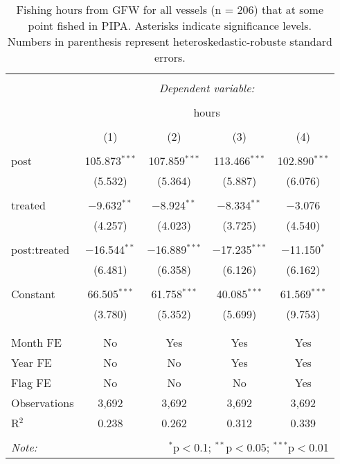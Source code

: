 \documentclass[]{article}
\theoremstyle{definition}
\theoremstyle{definition}
\theoremstyle{definition}
\theoremstyle{remark}
\begin{document}
\begin{table}[!htbp] \centering 
  \caption{\label{tab:all_vessels}Fishing hours from GFW for all vessels (n = 206) that at some point fished in PIPA. Asterisks indicate significance levels. Numbers in parenthesis represent heteroskedastic-robuste standard errors.} 
  \label{} 
\begin{tabular}{@{\extracolsep{5pt}}lcccc} 
\\[-1.8ex]\hline 
\hline \\[-1.8ex] 
 & \multicolumn{4}{c}{\textit{Dependent variable:}} \\ 
\cline{2-5} 
\\[-1.8ex] & \multicolumn{4}{c}{hours} \\ 
\\[-1.8ex] & (1) & (2) & (3) & (4)\\ 
\hline \\[-1.8ex] 
 post & 105.873$^{***}$ & 107.859$^{***}$ & 113.466$^{***}$ & 102.890$^{***}$ \\ 
  & (5.532) & (5.364) & (5.887) & (6.076) \\ 
  & & & & \\ 
 treated & $-$9.632$^{**}$ & $-$8.924$^{**}$ & $-$8.334$^{**}$ & $-$3.076 \\ 
  & (4.257) & (4.023) & (3.725) & (4.540) \\ 
  & & & & \\ 
 post:treated & $-$16.544$^{**}$ & $-$16.889$^{***}$ & $-$17.235$^{***}$ & $-$11.150$^{*}$ \\ 
  & (6.481) & (6.358) & (6.126) & (6.162) \\ 
  & & & & \\ 
 Constant & 66.505$^{***}$ & 61.758$^{***}$ & 40.085$^{***}$ & 61.569$^{***}$ \\ 
  & (3.780) & (5.352) & (5.699) & (9.753) \\ 
  & & & & \\ 
\hline \\[-1.8ex] 
Month FE & No & Yes & Yes & Yes \\ 
Year FE & No & No & Yes & Yes \\ 
Flag FE & No & No & No & Yes \\ 
Observations & 3,692 & 3,692 & 3,692 & 3,692 \\ 
R$^{2}$ & 0.238 & 0.262 & 0.312 & 0.339 \\ 
\hline 
\hline \\[-1.8ex] 
\textit{Note:}  & \multicolumn{4}{r}{$^{*}$p$<$0.1; $^{**}$p$<$0.05; $^{***}$p$<$0.01} \\ 
\end{tabular} 
\end{table}
\end{document}

